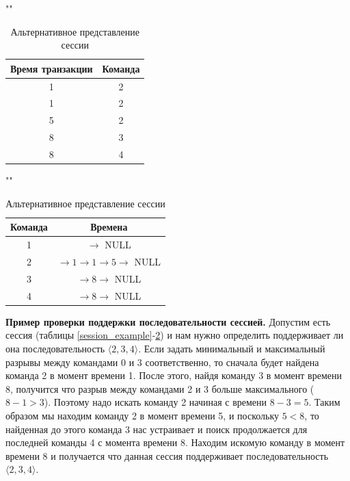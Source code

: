 \begin{table}[H]
	\begin{minipage}[h]{0.49\linewidth}
		\caption{Пример сессии}
		\label{session_example}
		""\newline
		\begin{tabular}{ | c | c | }
			\hline
			Время транзакции & Команда \\ \hline
			1 & 2 \\ \hline
			1 & 2 \\ \hline
			5 & 2 \\ \hline
			8 & 3 \\ \hline
			8 & 4 \\ \hline
		\end{tabular}
	\end{minipage}
	\begin{minipage}[h]{0.49\linewidth}
		\caption{Альтернативное представление сессии}
		\label{session_alternative_representation}
		""\newline
		\begin{tabular}{ | c | c | }
			\hline
			Команда & Времена \\ \hline
			1 & $\rightarrow$ NULL \\ \hline
			2 & $\rightarrow 1 \rightarrow 1 \rightarrow 5 \rightarrow$ NULL \\ \hline
			3 & $\rightarrow 8 \rightarrow$ NULL \\ \hline
			4 & $\rightarrow 8 \rightarrow$ NULL \\ \hline
		\end{tabular}
	\end{minipage}
\end{table}


\textbf{Пример проверки поддержки последовательности сессией.} Допустим есть сессия (таблицы \ref{session_example}-\ref{session_alternative_representation}) и нам нужно определить поддерживает ли она последовательность $\langle2,3,4\rangle$. Если задать минимальный и максимальный разрывы между командами 0 и 3 соответственно, то сначала будет найдена команда 2 в момент времени 1. После этого, найдя команду 3 в момент времени 8, получится что разрыв между командами 2 и 3 больше максимального ($8-1>3$). Поэтому надо искать команду 2 начиная с времени $8-3=5$. Таким образом мы находим команду 2 в момент времени 5, и поскольку $5<8$, то найденная до этого команда 3 нас устраивает и поиск продолжается для последней команды 4 с момента времени 8. Находим искомую команду в момент времени 8 и получается что данная сессия поддерживает последовательность $\langle2,3,4\rangle$.

